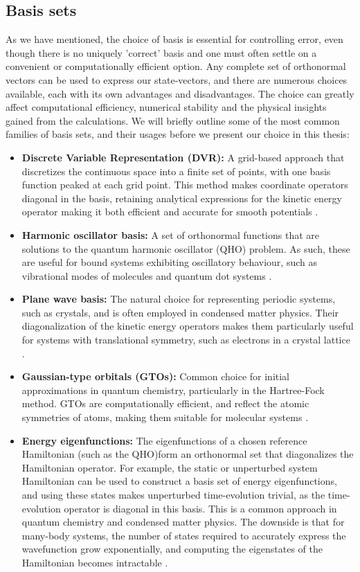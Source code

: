 \documentclass{subfiles}
\begin{document}
\subsection{Basis sets}\label{sec:basis_set}
As we have mentioned, the choice of basis is essential for controlling error, even though there is no uniquely 'correct' basis and one must often settle on a convenient or computationally efficient option. Any complete set of orthonormal vectors can be used to express our state-vectors, and there are numerous choices available, each with its own advantages and disadvantages. The choice can greatly affect computational efficiency, numerical stability and the physical insights gained from the calculations. We will briefly outline some of the most common families of basis sets, and their usages before we present our choice in this thesis:
\begin{itemize}
    \item \textbf{Discrete Variable Representation (DVR):} A grid-based approach that discretizes the continuous space into a finite set of points, with one basis function peaked at each grid point. This method makes coordinate operators diagonal in the basis, retaining analytical expressions for the kinetic energy operator making it both efficient and accurate for smooth potentials \cite{light1985generalized}. 
    \item \textbf{Harmonic oscillator basis:} A set of orthonormal functions that are solutions to the quantum harmonic oscillator (QHO) problem. As such, these are useful for bound systems exhibiting oscillatory behaviour, such as vibrational modes of molecules and quantum dot systems \cite{helgaker2013molecular}.
    \item \textbf{Plane wave basis:} The natural choice for representing periodic systems, such as crystals, and is often employed in condensed matter physics. Their diagonalization of the kinetic energy operators makes them particularly useful for systems with translational symmetry, such as electrons in a crystal lattice \cite{kittel2018introduction}.
    \item \textbf{Gaussian-type orbitals (GTOs):} Common choice for initial approximations in quantum chemistry, particularly in the Hartree-Fock method. GTOs are computationally efficient, and reflect the atomic symmetries of atoms, making them suitable for molecular systems \cite{szabo1996modern}.
    \item \textbf{Energy eigenfunctions:} The eigenfunctions of a chosen reference Hamiltonian (such as the QHO)form an orthonormal set that diagonalizes the Hamiltonian operator. For example, the static or unperturbed system Hamiltonian can be used to construct a basis set of energy eigenfunctions, and using these states makes unperturbed time-evolution trivial, as the time-evolution operator is diagonal in this basis. This is a common approach in quantum chemistry and condensed matter physics. The downside is that for many-body systems, the number of states required to accurately express the wavefunction grow exponentially, and computing the eigenstates of the Hamiltonian becomes intractable \cite{helgaker2013molecular, szabo1996modern}.
\end{itemize}
\end{document}
